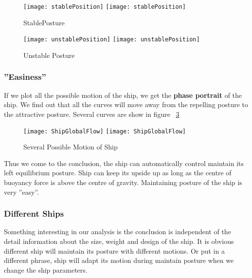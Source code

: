 \begin{figure}[!htbp]
  \begin{center}
    \leavevmode
    \ifpdf
      \texttt{[image: stablePosition]}
    \else
      \texttt{[image: stablePosition]}
    \fi
    \caption{StablePosture}
    \label{fig:StablePosture}
  \end{center}
\end{figure}


\begin{figure}[!htbp]
  \begin{center}
    \leavevmode
    \ifpdf
      \texttt{[image: unstablePosition]}
    \else
      \texttt{[image: unstablePosition]}
    \fi
    \caption{Unstable Posture}
    \label{fig:unStablePosture}
  \end{center}
\end{figure}


\subsubsection*{''Easiness''}
If we plot all the possible motion of the ship, we get the \textbf{phase portrait} of the ship. 
We find out that all the curves will move away from the repelling posture to the attractive posture.
 Several curves are show in figure ~\ref{fig:globalflow}
\begin{figure}[!htbp]
  \begin{center}
    \leavevmode
    \ifpdf
      \texttt{[image: ShipGlobalFlow]}
    \else
      \texttt{[image: ShipGlobalFlow]}
    \fi
    \caption{Several Possible Motion of Ship}
    \label{fig:globalflow}
  \end{center}
\end{figure}

Thus we come to the conclusion, the ship can automatically control maintain its left equilibrium posture. 
Ship can keep its upside up as long as the centre of buoyancy force is above the centre of gravity.
Maintaining posture of the ship is very ”easy”.


\subsubsection*{Different Ships} 
Something interesting in our analysis is the conclusion is independent of the detail information about the size, weight and design of the ship. 
It is obvious different ship will maintain its posture with different motions. 
Or put in a different phrase, ship will adapt its motion during maintain posture when we change the ship  parameters.

